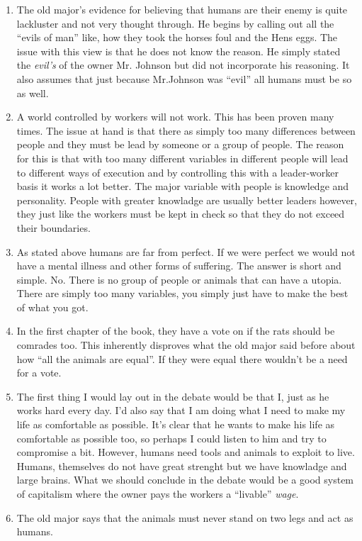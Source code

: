 \documentclass[12pt]{article}
\begin{document}
    \begin{enumerate}
        \item The old major's evidence for believing that humans are their enemy is quite lackluster and not very thought through. He begins by calling out all the ``evils of man'' like, how they took the horses foul and the Hens eggs. The issue with this view is that he does not know the reason. He simply stated the \textit{evil's} of the owner Mr. Johnson but did not incorporate his reasoning. It also assumes that just because Mr.Johnson was ``evil'' all humans must be so as well.
        \item A world controlled by workers will not work. This has been proven many times. The issue at hand is that there as simply too many differences between people and they must be lead by someone or a group of people. The reason for this is that with too many different variables in different people will lead to different ways of execution and by controlling this with a leader-worker basis it works a lot better. The major variable with people is knowledge and personality. People with greater knowladge are usually better leaders however, they just like the workers must be kept in check so that they do not exceed their boundaries.
        \item As stated above humans are far from perfect. If we were perfect we would not have a mental illness and other forms of suffering. The answer is short and simple. No. There is no group of people or animals that can have a utopia. There are simply too many variables, you simply just have to make the best of what you got.
        \item In the first chapter of the book, they have a vote on if the rats should be comrades too. This inherently disproves what the old major said before about how ``all the animals are equal''. If they were equal there wouldn't be a need for a vote.
        \item The first thing I would lay out in the debate would be that I, just as he works hard every day. I'd also say that I am doing what I need to make my life as comfortable as possible. It's clear that he wants to make his life as comfortable as possible too, so perhaps I could listen to him and try to compromise a bit. However, humans need tools and animals to exploit to live. Humans, themselves do not have great strenght but we have knowladge and large brains. What we should conclude in the debate would be a good system of capitalism where the owner pays the workers a ``livable'' \textit{wage}.
        \item The old major says that the animals must never stand on two legs and act as humans.
    \end{enumerate}
\end{document}
